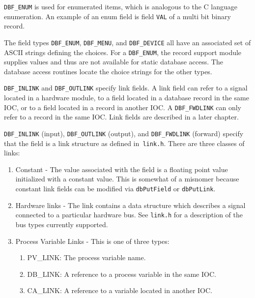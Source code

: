 \verb|DBF_ENUM| is used for enumerated items, which is analogous to the C language enumeration. An example of an enum 
field is field \verb|VAL| of a multi bit binary record. 

The field types \verb|DBF_ENUM|, \verb|DBF_MENU|, and \verb|DBF_DEVICE| all have an associated set of ASCII strings defining the 
choices. For a \verb|DBF_ENUM|, the record support module supplies values and thus are not available for static database access. 
The database access routines locate the choice strings for the other types.

\verb|DBF_INLINK| and \verb|DBF_OUTLINK| specify link fields. A link field can refer to a signal located in a hardware module, to a 
field located in a database record in the same IOC, or to a field located in a record in another IOC. A \verb|DBF_FWDLINK| can 
only refer to a record in the same IOC. Link fields are described in a later chapter. 

\verb|DBF_INLINK| (input), \verb|DBF_OUTLINK| (output), and \verb|DBF_FWDLINK| (forward) specify that the field is a link structure as 
defined in\verb| link.h|. There are three classes of links:

\begin{enumerate}\item Constant - The value associated with the field is a floating point value initialized with a constant value. This is 
somewhat of a misnomer because constant link fields can be modified via \verb|dbPutField| or \verb|dbPutLink|.

\item Hardware links - The link contains a data structure which describes a signal connected to a particular hardware bus. 
See \verb|link.h| for a description of the bus types currently supported.

\item Process Variable Links - This is one of three types:

\begin{enumerate}

\item PV\_LINK: The process variable name.

\item DB\_LINK: A reference to a process variable in the same IOC.

\item CA\_LINK: A reference to a variable located in another IOC.

\end{enumerate}

\end{enumerate}

